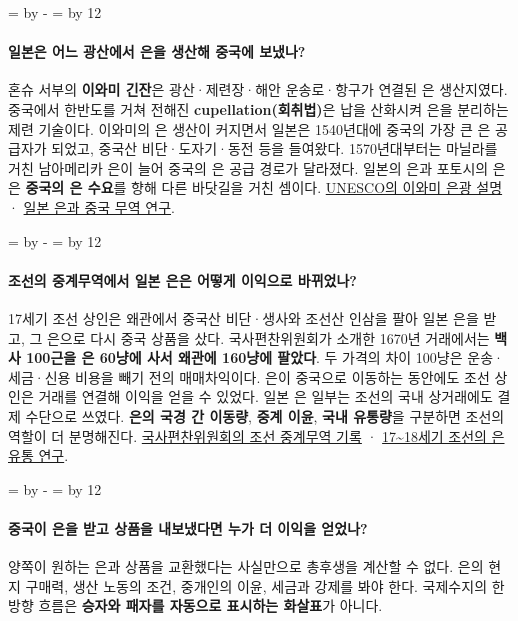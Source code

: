 \documentclass[10pt,a4paper]{article}
\newcommand{\ReserveQuestionSpace}{%
  \par\begingroup
  \dimen0=\pagegoal \advance\dimen0 by -\pagetotal
  \dimen2=\baselineskip \multiply\dimen2 by 12
  \ifdim\dimen0<\dimen2 \newpage\fi
  \endgroup}
\begin{document}
\ReserveQuestionSpace
\paragraph{일본은 어느 광산에서 은을 생산해 중국에 보냈나?}
혼슈 서부의 \textbf{이와미 긴잔}은 광산·제련장·해안 운송로·항구가 연결된 은 생산지였다. 중국에서 한반도를 거쳐 전해진 \textbf{cupellation(회취법)}은 납을 산화시켜 은을 분리하는 제련 기술이다. 이와미의 은 생산이 커지면서 일본은 1540년대에 중국의 가장 큰 은 공급자가 되었고, 중국산 비단·도자기·동전 등을 들여왔다. 1570년대부터는 마닐라를 거친 남아메리카 은이 늘어 중국의 은 공급 경로가 달라졌다. 일본의 은과 포토시의 은은 \textbf{중국의 은 수요}를 향해 다른 바닷길을 거친 셈이다. \href{https://whc.unesco.org/en/list/1246/}{UNESCO의 이와미 은광 설명} · \href{https://www.cambridge.org/core/journals/international-journal-of-asian-studies/article/abs/establishment-of-silver-currency-in-kyoto/7A9D21AA2F939A13ACC906B62A06FECD}{일본 은과 중국 무역 연구}.\par

\ReserveQuestionSpace
\paragraph{조선의 중계무역에서 일본 은은 어떻게 이익으로 바뀌었나?}
17세기 조선 상인은 왜관에서 중국산 비단·생사와 조선산 인삼을 팔아 일본 은을 받고, 그 은으로 다시 중국 상품을 샀다. 국사편찬위원회가 소개한 1670년 거래에서는 \textbf{백사 100근을 은 60냥에 사서 왜관에 160냥에 팔았다}. 두 가격의 차이 100냥은 운송·세금·신용 비용을 빼기 전의 매매차익이다. 은이 중국으로 이동하는 동안에도 조선 상인은 거래를 연결해 이익을 얻을 수 있었다. 일본 은 일부는 조선의 국내 상거래에도 결제 수단으로 쓰였다. \textbf{은의 국경 간 이동량}, \textbf{중계 이윤}, \textbf{국내 유통량}을 구분하면 조선의 역할이 더 분명해진다. \href{https://contents.history.go.kr/front/nh/print.do?levelId=nh\_030\_0060\_0050\_0030\&whereStr=}{국사편찬위원회의 조선 중계무역 기록} · \href{https://kiss.kstudy.com/Detail/Ar?key=3504401}{17\textasciitilde{}18세기 조선의 은 유통 연구}.\par

\ReserveQuestionSpace
\paragraph{중국이 은을 받고 상품을 내보냈다면 누가 더 이익을 얻었나?}
양쪽이 원하는 은과 상품을 교환했다는 사실만으로 총후생을 계산할 수 없다. 은의 현지 구매력, 생산 노동의 조건, 중개인의 이윤, 세금과 강제를 봐야 한다. 국제수지의 한 방향 흐름은 \textbf{승자와 패자를 자동으로 표시하는 화살표}가 아니다.\par
\end{document}
